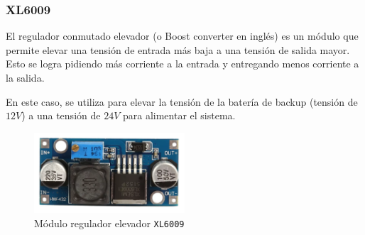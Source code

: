 \subsubsection{XL6009}

El regulador conmutado elevador (o Boost converter en inglés) es un módulo que permite elevar una tensión de entrada más baja a una tensión de salida mayor. Esto se logra pidiendo más corriente a la entrada y entregando menos corriente a la salida.\cite{xlsemi400KHz604}

En este caso, se utiliza para elevar la tensión de la batería de backup (tensión de $12 V$) a una tensión de $24 V$ para alimentar el sistema.

\begin{figure}[H]
    \centering
    \includegraphics[width=0.5\textwidth]{images/2-hardware/componentes/XL6009.png}
    \caption{Módulo regulador elevador \texttt{XL6009}}
    \label{fig:hardware/modulos/xl6009}
\end{figure}